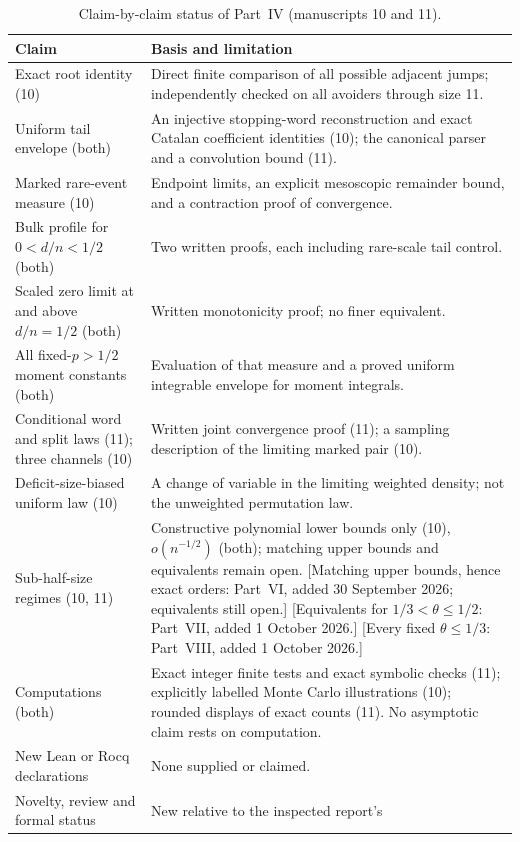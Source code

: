 \documentclass[11pt,a4paper]{article}
\theoremstyle{definition}\newaliascnt{definition}{theorem}
\theoremstyle{remark}\newaliascnt{remark}{theorem}
\begin{document}
\begin{table}[htbp]
\centering\small
\caption{Claim-by-claim status of Part~IV (manuscripts 10 and 11).}
\label{mj:tab:audit}
\begin{tabular}{p{.37\linewidth}p{.56\linewidth}}
\toprule
Claim & Basis and limitation\\
\midrule
Exact root identity (10) & Direct finite comparison of all possible adjacent
 jumps; independently checked on all avoiders through size 11.\\
Uniform tail envelope (both) & An injective stopping-word reconstruction and
 exact Catalan coefficient identities (10); the canonical parser and a
 convolution bound (11).\\
Marked rare-event measure (10) & Endpoint limits, an explicit mesoscopic
 remainder bound, and a contraction proof of convergence.\\
Bulk profile for $0<d/n<1/2$ (both) & Two written proofs, each including
 rare-scale tail control.\\
Scaled zero limit at and above $d/n=1/2$ (both) & Written monotonicity proof;
 no finer equivalent.\\
All fixed-$p>1/2$ moment constants (both) & Evaluation of that measure and a
 proved uniform integrable envelope for moment integrals.\\
Conditional word and split laws (11); three channels (10) & Written joint
 convergence proof (11); a sampling description of the limiting marked pair
 (10).\\
Deficit-size-biased uniform law (10) & A change of variable in the limiting
 weighted density; not the unweighted permutation law.\\
Sub-half-size regimes (10, 11) & Constructive polynomial lower bounds only
 (10), $o(n^{-1/2})$ (both); matching upper bounds and equivalents remain
 open. [Matching upper bounds, hence exact orders: Part~VI, added
 30 September 2026; equivalents still open.] [Equivalents for
 $1/3<\theta\le1/2$: Part~VII, added 1 October 2026.] [Every fixed $\theta\le1/3$:
 Part~VIII, added 1 October 2026.]\\
Computations (both) & Exact integer finite tests and exact symbolic checks
 (11); explicitly labelled Monte Carlo illustrations (10); rounded displays of
 exact counts (11). No asymptotic claim rests on computation.\\
New Lean or Rocq declarations & None supplied or claimed.\\
Novelty, review and formal status & New relative to the inspected report's

\end{tabular}
\end{table}
\end{document}
